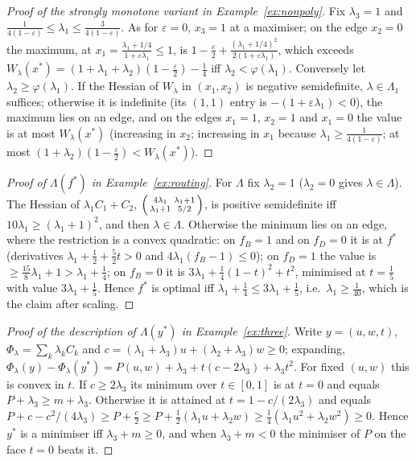 \documentclass[11pt,a4paper]{article}
\theoremstyle{plain}
\theoremstyle{definition}
\theoremstyle{remark}
\newcommand{\Lam}{\Lambda}
\newcommand{\Lone}{\Lambda_{1}}
\begin{document}
\begin{proof}[Proof of the strongly monotone variant in Example~\ref{ex:nonpoly}]
Fix $\lambda_3=1$ and $\frac1{4(1-\varepsilon)}\le\lambda_1\le\frac3{4(1-\varepsilon)}$. As for $\varepsilon=0$, $x_3=1$ at a maximiser; on the edge $x_2=0$ the maximum, at $x_1=\frac{\lambda_1+1/4}{1+\varepsilon\lambda_1}\le1$, is $1-\frac\varepsilon2+\frac{(\lambda_1+1/4)^2}{2(1+\varepsilon\lambda_1)}$, which exceeds $W_\lambda(x^*)=(1+\lambda_1+\lambda_2)(1-\frac\varepsilon2)-\frac14$ iff $\lambda_2<\varphi(\lambda_1)$. Conversely let $\lambda_2\ge\varphi(\lambda_1)$. If the Hessian of $W_\lambda$ in $(x_1,x_2)$ is negative semidefinite, $\lambda\in\Lone$ suffices; otherwise it is indefinite (its $(1,1)$ entry is $-(1+\varepsilon\lambda_1)<0$), the maximum lies on an edge, and on the edges $x_1=1$, $x_2=1$ and $x_1=0$ the value is at most $W_\lambda(x^*)$ (increasing in $x_2$; increasing in $x_1$ because $\lambda_1\ge\frac1{4(1-\varepsilon)}$; at most $(1+\lambda_2)(1-\frac\varepsilon2)<W_\lambda(x^*)$).
\end{proof}

\begin{proof}[Proof of $\Lam(f^*)$ in Example~\ref{ex:routing}]
For $\Lam$ fix $\lambda_2=1$ ($\lambda_2=0$ gives $\lambda\in\Lam$). The Hessian of $\lambda_1C_1+C_2$, $\begin{psmallmatrix}4\lambda_1&\lambda_1+1\\\lambda_1+1&5/2\end{psmallmatrix}$, is positive semidefinite iff $10\lambda_1\ge(\lambda_1+1)^2$, and then $\lambda\in\Lam$. Otherwise the minimum lies on an edge, where the restriction is a convex quadratic: on $f_B=1$ and on $f_D=0$ it is at $f^*$ (derivatives $\lambda_1+\tfrac12+\tfrac52t>0$ and $4\lambda_1(f_B-1)\le 0$); on $f_D=1$ the value is $\ge\tfrac{15}{8}\lambda_1+1>\lambda_1+\tfrac14$; on $f_B=0$ it is $3\lambda_1+\tfrac14(1-t)^2+t^2$, minimised at $t=\tfrac15$ with value $3\lambda_1+\tfrac15$. Hence $f^*$ is optimal iff $\lambda_1+\tfrac14\le3\lambda_1+\tfrac15$, i.e.\ $\lambda_1\ge\tfrac1{40}$, which is the claim after scaling.
\end{proof}

\begin{proof}[Proof of the description of $\Lam(y^*)$ in Example~\ref{ex:three}]
Write $y=(u,w,t)$, $\Phi_\lambda=\sum_k\lambda_kC_k$ and $c=(\lambda_1+\lambda_3)u+(\lambda_2+\lambda_3)w\ge0$; expanding, $\Phi_\lambda(y)-\Phi_\lambda(y^*)=P(u,w)+\lambda_3+t(c-2\lambda_3)+\lambda_3t^2$. For fixed $(u,w)$ this is convex in $t$. If $c\ge2\lambda_3$ its minimum over $t\in[0,1]$ is at $t=0$ and equals $P+\lambda_3\ge m+\lambda_3$. Otherwise it is attained at $t=1-c/(2\lambda_3)$ and equals $P+c-c^2/(4\lambda_3)\ge P+\tfrac c2\ge P+\tfrac12(\lambda_1u+\lambda_2w)\ge\tfrac14(\lambda_1u^2+\lambda_2w^2)\ge0$. Hence $y^*$ is a minimiser iff $\lambda_3+m\ge0$, and when $\lambda_3+m<0$ the minimiser of $P$ on the face $t=0$ beats it.
\end{proof}
\end{document}
